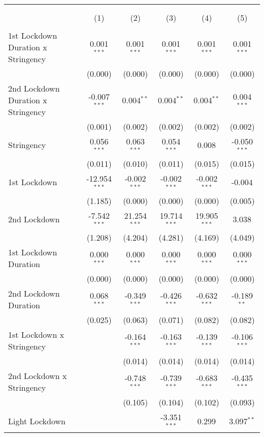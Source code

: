 \begin{tabular}{@{\extracolsep{5pt}}lccccc}
\\[-1.8ex]\hline
\hline \\[-1.8ex]
& \multicolumn{5}{c}{\textit{}} \
\cr \cline{5-6}
\\[-1.8ex] & (1) & (2) & (3) & (4) & (5) \\
\hline \\[-1.8ex]
 1st Lockdown Duration x Stringency & 0.001$^{***}$ & 0.001$^{***}$ & 0.001$^{***}$ & 0.001$^{***}$ & 0.001$^{***}$ \\
  & (0.000) & (0.000) & (0.000) & (0.000) & (0.000) \\
 2nd Lockdown Duration x Stringency & -0.007$^{***}$ & 0.004$^{**}$ & 0.004$^{**}$ & 0.004$^{**}$ & 0.004$^{***}$ \\
  & (0.001) & (0.002) & (0.002) & (0.002) & (0.002) \\
 Stringency & 0.056$^{***}$ & 0.063$^{***}$ & 0.054$^{***}$ & 0.008$^{}$ & -0.050$^{***}$ \\
  & (0.011) & (0.010) & (0.011) & (0.015) & (0.015) \\
 1st Lockdown & -12.954$^{***}$ & -0.002$^{***}$ & -0.002$^{***}$ & -0.002$^{***}$ & -0.004$^{}$ \\
  & (1.185) & (0.000) & (0.000) & (0.000) & (0.005) \\
 2nd Lockdown & -7.542$^{***}$ & 21.254$^{***}$ & 19.714$^{***}$ & 19.905$^{***}$ & 3.038$^{}$ \\
  & (1.208) & (4.204) & (4.281) & (4.169) & (4.049) \\
 1st Lockdown Duration & 0.000$^{***}$ & 0.000$^{***}$ & 0.000$^{***}$ & 0.000$^{***}$ & 0.000$^{***}$ \\
  & (0.000) & (0.000) & (0.000) & (0.000) & (0.000) \\
 2nd Lockdown Duration & 0.068$^{***}$ & -0.349$^{***}$ & -0.426$^{***}$ & -0.632$^{***}$ & -0.189$^{**}$ \\
  & (0.025) & (0.063) & (0.071) & (0.082) & (0.082) \\
 1st Lockdown x Stringency & & -0.164$^{***}$ & -0.163$^{***}$ & -0.139$^{***}$ & -0.106$^{***}$ \\
  & & (0.014) & (0.014) & (0.014) & (0.014) \\
 2nd Lockdown x Stringency & & -0.748$^{***}$ & -0.739$^{***}$ & -0.683$^{***}$ & -0.435$^{***}$ \\
  & & (0.105) & (0.104) & (0.102) & (0.093) \\
 Light Lockdown & & & -3.351$^{***}$ & 0.299$^{}$ & 3.097$^{**}$ \\

\end{tabular}

